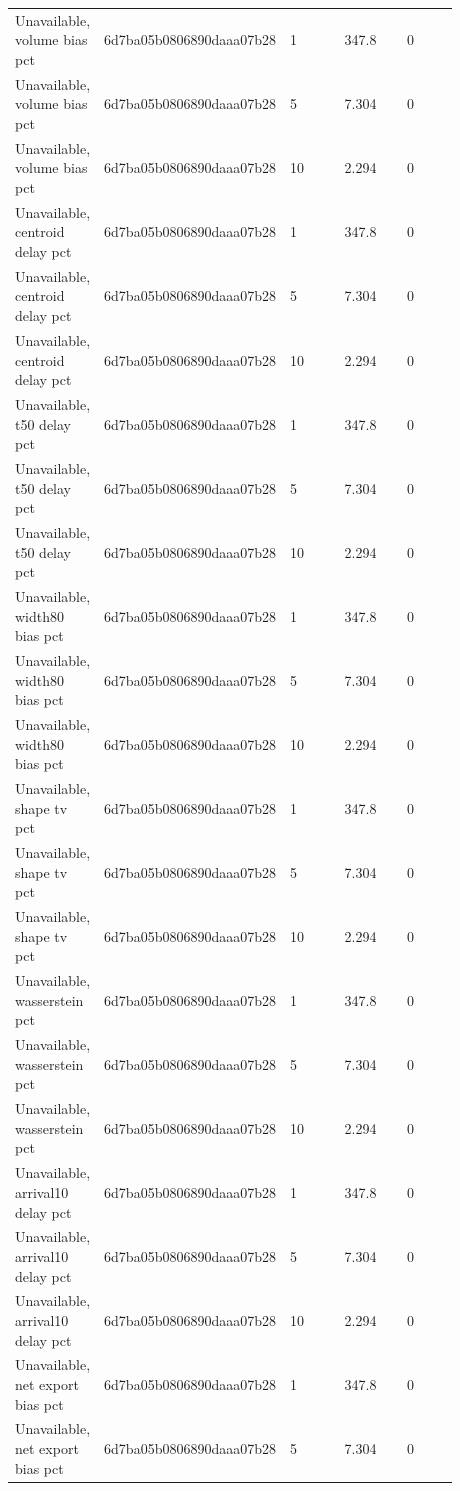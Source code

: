 \begin{longtable}{p{0.1760\linewidth}p{0.1760\linewidth}p{0.1760\linewidth}p{0.1760\linewidth}p{0.1760\linewidth}}
Unavailable, volume bias pct & 6d7ba05b0806890daaa07b28 & 1 & 347.8 & 0 \\
Unavailable, volume bias pct & 6d7ba05b0806890daaa07b28 & 5 & 7.304 & 0 \\
Unavailable, volume bias pct & 6d7ba05b0806890daaa07b28 & 10 & 2.294 & 0 \\
Unavailable, centroid delay pct & 6d7ba05b0806890daaa07b28 & 1 & 347.8 & 0 \\
Unavailable, centroid delay pct & 6d7ba05b0806890daaa07b28 & 5 & 7.304 & 0 \\
Unavailable, centroid delay pct & 6d7ba05b0806890daaa07b28 & 10 & 2.294 & 0 \\
Unavailable, t50 delay pct & 6d7ba05b0806890daaa07b28 & 1 & 347.8 & 0 \\
Unavailable, t50 delay pct & 6d7ba05b0806890daaa07b28 & 5 & 7.304 & 0 \\
Unavailable, t50 delay pct & 6d7ba05b0806890daaa07b28 & 10 & 2.294 & 0 \\
Unavailable, width80 bias pct & 6d7ba05b0806890daaa07b28 & 1 & 347.8 & 0 \\
Unavailable, width80 bias pct & 6d7ba05b0806890daaa07b28 & 5 & 7.304 & 0 \\
Unavailable, width80 bias pct & 6d7ba05b0806890daaa07b28 & 10 & 2.294 & 0 \\
Unavailable, shape tv pct & 6d7ba05b0806890daaa07b28 & 1 & 347.8 & 0 \\
Unavailable, shape tv pct & 6d7ba05b0806890daaa07b28 & 5 & 7.304 & 0 \\
Unavailable, shape tv pct & 6d7ba05b0806890daaa07b28 & 10 & 2.294 & 0 \\
Unavailable, wasserstein pct & 6d7ba05b0806890daaa07b28 & 1 & 347.8 & 0 \\
Unavailable, wasserstein pct & 6d7ba05b0806890daaa07b28 & 5 & 7.304 & 0 \\
Unavailable, wasserstein pct & 6d7ba05b0806890daaa07b28 & 10 & 2.294 & 0 \\
Unavailable, arrival10 delay pct & 6d7ba05b0806890daaa07b28 & 1 & 347.8 & 0 \\
Unavailable, arrival10 delay pct & 6d7ba05b0806890daaa07b28 & 5 & 7.304 & 0 \\
Unavailable, arrival10 delay pct & 6d7ba05b0806890daaa07b28 & 10 & 2.294 & 0 \\
Unavailable, net export bias pct & 6d7ba05b0806890daaa07b28 & 1 & 347.8 & 0 \\
Unavailable, net export bias pct & 6d7ba05b0806890daaa07b28 & 5 & 7.304 & 0 \\

\end{longtable}
